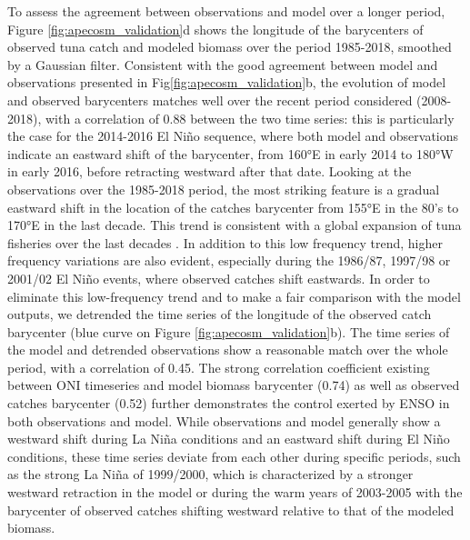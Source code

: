To assess the agreement between observations and model over a longer period, Figure \ref{fig:apecosm_validation}d shows the longitude of the barycenters of observed tuna catch and modeled biomass over the period 1985-2018, smoothed by a Gaussian filter. Consistent with the good agreement between model and observations presented in Fig\ref{fig:apecosm_validation}b, the evolution of model and observed barycenters matches well over the recent period considered (2008-2018), with a correlation of 0.88 between the two time series: this is particularly the case for the 2014-2016 El Niño sequence, where both model and observations indicate an eastward shift of the barycenter, from 160°E in early 2014 to 180°W in early 2016, before retracting westward after that date. Looking at the observations over the 1985-2018 period, the most striking feature is a gradual eastward shift in the location of the catches barycenter from 155°E in the 80's to 170°E in the last decade. This trend is
consistent with a global expansion of tuna fisheries over the last decades \citep{coulterUsingHarmonizedHistorical2020}. 
In addition to this low frequency trend, higher frequency variations are also evident, especially during the 1986/87, 1997/98 or 2001/02 El Niño events, where observed catches shift eastwards. In order to eliminate this low-frequency trend and to make a fair comparison with the model outputs, we detrended the time series of the longitude of the observed catch barycenter (blue curve on Figure \ref{fig:apecosm_validation}b). The time series of the model and detrended observations show a reasonable match over the whole period, with a correlation of 0.45. The strong correlation coefficient existing between ONI timeseries and model biomass barycenter (0.74) as well as observed catches barycenter (0.52) further demonstrates the control exerted by ENSO in both observations and model. While observations and model generally show a westward shift during La Niña conditions and an eastward shift during El Niño conditions, these time series deviate from each other during specific periods, such as the strong La Niña of 1999/2000, which is characterized by a stronger westward retraction in the model or during the warm years of 2003-2005 with the barycenter of observed catches shifting westward relative to that of the modeled biomass.

